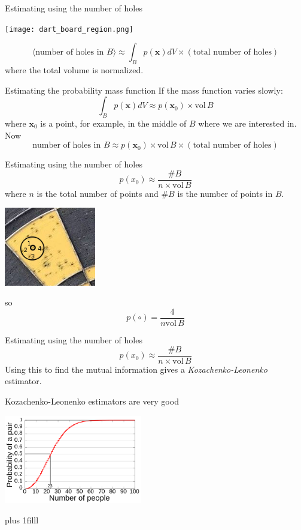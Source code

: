 \documentclass{beamer}
\newcommand{\btVFill}{\vskip0pt plus 1filll}
\begin{document}
\begin{frame}{Estimating using the number of holes}
\color{reddish}
\begin{center}
\texttt{[image: dart\_board\_region.png]}
\end{center}
\color{dark}
$$\langle \mbox{number of holes in }B\rangle \approx \int_B p(\mathbf{x})dV \times (\mbox{total number of holes})$$
\color{black}
where the total volume is normalized.
\end{frame}

\begin{frame}{Estimating the probability mass function}
\color{black}
If the mass function varies slowly:
\color{dark}
$$\int_B p(\mathbf{x})dV\approx p(\mathbf{x}_0) \times \mbox{vol}\,B$$
\color{black}
where $\textbf{x}_0$ is a point, for example, in the middle of $B$ where we are interested in. Now
\color{dark}
$$\mbox{number of holes in }B \approx p(\mathbf{x}_0) \times \mbox{vol}\,B \times (\mbox{total number of holes})$$
\color{black}
\end{frame}


\begin{frame}{Estimating using the number of holes}
\color{dark}
$$p(x_0)\approx\frac{\#B}{n\times \mbox{vol}\,B}
$$
\color{black}
where $n$ is the total number of points and $\#B$ is the number of points in $B$.
\color{reddish}
\begin{center}
\includegraphics[width=4cm]{dart_board_zoom_ball.png}
\end{center}
\color{dark}
so 
$$p(\circ)=\frac{4}{n\mbox{vol}\,B}$$
\end{frame}


\begin{frame}{Estimating using the number of holes}
\color{dark}
$$p(x_0)\approx\frac{\#B}{n\times \mbox{vol}\,B}$$
\color{black}
Using this to find the mutual information gives a \textsl{Kozachenko-Leonenko} estimator.
\end{frame}

\begin{frame}{Kozachenko-Leonenko estimators are very good}
\color{reddish}
\begin{center}
\includegraphics[width=6cm]{Birthday_Paradox.png}
\end{center}
\color{black}
\btVFill
\color{gray}
\color{black}
\end{frame}
\end{document}
